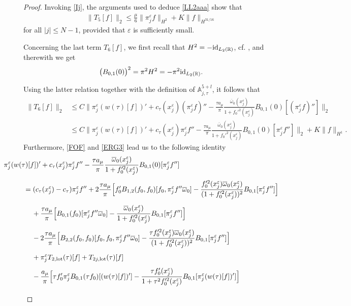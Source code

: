 \documentclass[11pt,reqno]{amsart}
\numberwithin{equation}{section}
\newcommand{\0}{\Omega}
\newcommand{\e}{\varepsilon}
\newcommand{\ov}{\overline}
\newcommand{\oo}{\ov\omega}
\newcommand{\bA}{\mathbb{A}}
\newcommand{\R}{\mathbb{R}}
\numberwithin{equation}{section}
\begin{document}
\begin{proof}
Invoking \eqref{Ij},  the arguments used to deduce \eqref{LL2aaa} show that 
\begin{align}\label{ca42}
 \|T_{5}[f]\|_2\leq \frac{\mu}{6}\|\pi_j^\e f\|_{H^2} +K\|f\|_{H^{31/16}}
\end{align}
for all $|j|\leq N-1$, provided that $\e$ is  sufficiently small.


Concerning the last term $T_{6}[f]$, we first recall that $H^2=-{\rm id}_{L_2(\R)}$, cf. \cite{St93},  and therewith we get
$$\big(B_{0,1}(0)\big)^2=\pi^2 H^2=-\pi^2{\rm id}_{L_2(\R)}.$$

Using the latter relation together with the definition of $\bA_{j,\tau}^{5+l}$, it follows that
\begin{align}
 \|T_6[f]\|_2&\leq C\Big\|\pi_j^\e(w(\tau)[f])'+c_\tau(x_j^\e)(\pi_j^\e f)''-\frac{\tau a_\mu}{\pi}\frac{\oo_0(x_j^\e)}{ 1+ f_0'^2(x_j^\e) }B_{0,1}(0)[(\pi_j^\e f)'']\Big\|_2\nonumber\\[1ex]
 &\leq C\Big\|\pi_j^\e(w(\tau)[f])'+c_\tau(x_j^\e)\pi_j^\e f''-\frac{\tau a_\mu}{\pi}\frac{\oo_0(x_j^\e)}{ 1+ f_0'^2(x_j^\e) }B_{0,1}(0)[\pi_j^\e f'']\Big\|_2+K\|f\|_{H^1}.\label{GFG1}
\end{align}
Furthermore,   \eqref{FOF} and \eqref{ERG3} lead us to the following identity
\begin{align}
 &\hspace{-1cm}\pi_j^\e(w(\tau)[f])'+c_\tau(x_j^\e)\pi_j^\e f''-\frac{\tau a_\mu}{\pi}\frac{\oo_0(x_j^\e)}{ 1+ f_0'^2(x_j^\e) }B_{0,1}(0)[\pi_j^\e f'']\nonumber\\[1ex]
 &= (c_\tau (x_j^\e)-c_\tau)\pi_j^\e f''+2\frac{\tau a_\mu}{\pi}\Big[f_0'B_{1,2}(f_0,f_0)[f_0,\pi_j^\e f''\oo_0] -\frac{ f_0'^2(x_j^\e)\oo_0(x_j^\e)}{(1+ f_0'^2(x_j^\e))^2}B_{0,1}[\pi_j^\e f'']\Big]\nonumber\\[1ex]
 &\hspace{0.424cm}+\frac{\tau a_\mu}{\pi}\Big[ B_{0,1}(f_0)[\pi_j^\e f''\oo_0]- \frac{\oo_0(x_j^\e)}{ 1+ f_0'^2(x_j^\e) }B_{0,1}[\pi_j^\e f'']\Big]\nonumber\\[1ex]
 &\hspace{0.424cm}-2\frac{\tau a_\mu}{\pi}\Big[  B_{2,2}(f_0,f_0)[f_0, f_0,\pi_j^\e f''\oo_0]-\frac{\tau f_0'^2(x_j^\e)\oo_0(x_j^\e)}{(1+ f_0'^2(x_j^\e))^2}B_{0,1}[\pi_j^\e f'']\Big]\nonumber\\[1ex]
 &\hspace{0.424cm}+\pi_j^\e T_{2,{\rm lot}}(\tau)[f] +T_{2j, {\rm lot}}(\tau)[f]\nonumber\\[1ex]
 &\hspace{0.424cm}-\frac{a_\mu}{\pi}\Big[\tau f_0'\pi_j^\e B_{0,1}(\tau f_0)[(w(\tau)[f])'] -\frac{ \tau f_0'(x_j^\e) }{ 1+ \tau^2 f_0'^2(x_j^\e) }B_{0,1}[\pi_j^\e (w(\tau)[f])']\Big] \nonumber\\[1ex] 

\end{align}
\end{proof}
\end{document}
